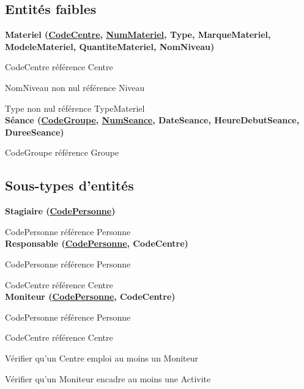 \documentclass[10pt]{article}
\begin{document}
\subsection{Entités faibles}

\begin{small}

 \textbf{Materiel (\underline{CodeCentre}, \underline{NumMateriel}, Type, MarqueMateriel, ModeleMateriel, QuantiteMateriel, NomNiveau)}
 
    \hspace{1cm}CodeCentre référence Centre 
    
\hspace{1cm}NomNiveau non nul référence Niveau

\hspace{1cm}Type non nul référence TypeMateriel\\

\textbf{Séance (\underline{CodeGroupe}, \underline{NumSeance}, DateSeance, HeureDebutSeance, DureeSeance)}

    \hspace{1cm}CodeGroupe référence Groupe\\
    
\end{small}

\subsection{Sous-types d'entités}

\begin{small}

 \textbf{Stagiaire (\underline{CodePersonne}) }
 
    \hspace{1cm}CodePersonne référence Personne\\

\textbf{Responsable (\underline{CodePersonne}, CodeCentre)}

    \hspace{1cm}CodePersonne référence Personne
    
    \hspace{1cm}CodeCentre référence Centre\\

\textbf{Moniteur (\underline{CodePersonne}, CodeCentre)}

    \hspace{1cm}CodePersonne référence Personne
    
    \hspace{1cm}CodeCentre référence Centre
    
    \hspace{1cm}Vérifier qu’un Centre emploi au moins un Moniteur
    
    \hspace{1cm}Vérifier qu’un Moniteur encadre au moins une Activite\\
    
\end{small}
\end{document}

